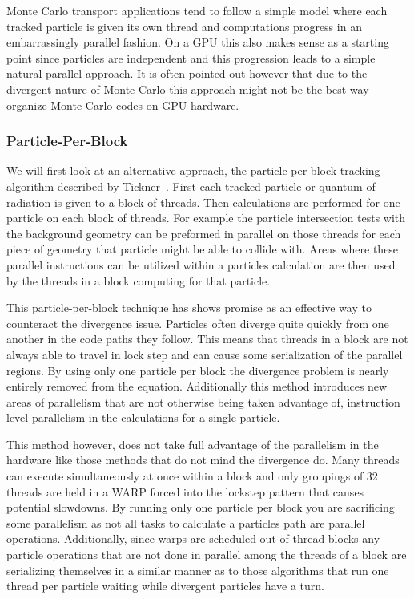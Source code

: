 %
Monte Carlo transport applications tend to follow a simple model where each tracked particle is given its own thread and computations progress in an embarrassingly parallel fashion. 
%
On a GPU this also makes sense as a starting point since particles are independent and this progression leads to a simple natural parallel approach.
%
It is often pointed out however that due to the divergent nature of Monte Carlo this approach might not be the best way organize Monte Carlo codes on GPU hardware.
%

\subsubsection*{\textbf{Particle-Per-Block}}
We will first look at an alternative approach, the particle-per-block tracking algorithm described by Tickner~\cite{tickner2010monte}.
%
First each tracked particle or quantum of radiation is given to a block of threads.
%
Then calculations are performed for one particle on each block of threads.
%
For example the particle intersection tests with the background geometry can be preformed in parallel on those threads for each piece of geometry that particle might be able to collide with.
%
Areas where these parallel instructions can be utilized within a particles calculation are then used by the threads in a block computing for that particle.
%

This particle-per-block technique has shows promise as an effective way to counteract the divergence issue.
%
Particles often diverge quite quickly from one another in the code paths they follow.
%
This means that threads in a block are not always able to travel in lock step and can cause some serialization of the parallel regions.
%
By using only one particle per block the divergence problem is nearly entirely removed from the equation.
%
Additionally this method introduces new areas of parallelism that are not otherwise being taken advantage of, instruction level parallelism in the calculations for a single particle.
%

%
This method however, does not take full advantage of the parallelism in the hardware like those methods that do not mind the divergence do.
%
Many threads can execute simultaneously at once within a block and only groupings of 32 threads are held in a WARP forced into the lockstep pattern that causes potential slowdowns.
%
By running only one particle per block you are sacrificing some parallelism as not all tasks to calculate a particles path are parallel operations.
%
Additionally, since warps are scheduled out of thread blocks any particle operations that are not done in parallel among the threads of a block are serializing themselves in a similar manner as to those algorithms that run one thread per particle waiting while divergent particles have a turn.
%

